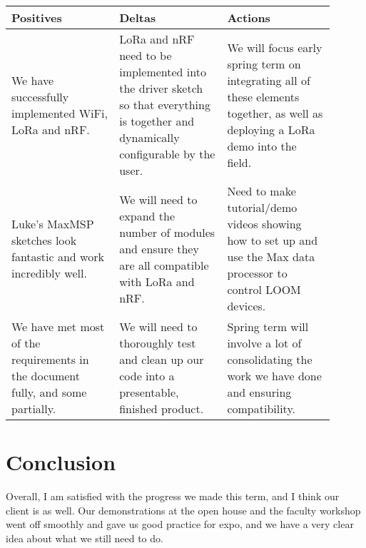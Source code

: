 \documentclass[onecolumn, draftclsnofoot,10pt, compsoc]{IEEEtran}
\begin{document}
\begin{center}
\begin{longtable}{|p{0.3\linewidth}|p{0.3\linewidth}|p{0.3\linewidth}|} 

 \hline
 \textbf{Positives} & \textbf{Deltas} & \textbf{Actions} \\ 
 \hline 
 We have successfully implemented WiFi, LoRa and nRF. & LoRa and nRF need to be implemented into the driver sketch so that everything is together and dynamically configurable by the user. & We will focus early spring term on integrating all of these elements together, as well as deploying a LoRa demo into the field.\\
 \hline
 Luke's MaxMSP sketches look fantastic and work incredibly well. & We will need to expand the number of modules and ensure they are all compatible with LoRa and nRF. & Need to make tutorial/demo videos showing how to set up and use the Max data processor to control LOOM devices.\\ 
 \hline
 We have met most of the requirements in the document fully, and some partially. & We will need to thoroughly test and clean up our code into a presentable, finished product. & Spring term will involve a lot of consolidating the work we have done and ensuring compatibility.\\ 
 \hline
 
\end{longtable}
\end{center}

\section{Conclusion}
Overall, I am satisfied with the progress we made this term, and I think our client is as well. Our demonstrations at the open house and the faculty workshop went off smoothly and gave us good practice for expo, and we have a very clear idea about what we still need to do.

% 
% 
\end{document}
